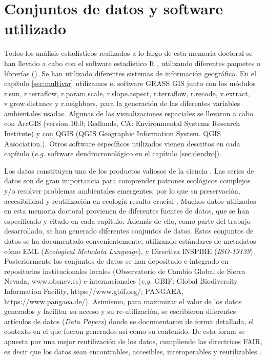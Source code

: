 \section{Conjuntos de datos y software utilizado}\label{sec:metodologia:datos}

Todos los análisis estadísticos realizados a lo largo de esta memoria doctoral se han llevado a cabo con el software estadístico R \autocite{RCoreTeam2020LanguageEnvironment}, utilizando diferentes paquetes o librerías (). Se han utilizado diferentes sistemas de información geográfica. En el capítulo \ref{sec:multivar} utilizamos el software GRASS GIS \autocite{Neteleretal2012GRASSGIS} junto con los módulos r.sun, r.terraflow, r.param.scale, r.slope.aspect, r.terraflow, r.recode, v.extract, v.grow.distance y r.neighbors, para la generación de las diferentes variables ambientales usadas. Algunas de las visualizaciones espaciales se llevaron a cabo con ArcGIS (version 10.0; Redlands, CA: Environmental Systems Research Institute) y con QGIS (QGIS Geographic Information System. QGIS Association.). Otros software específicos utilizados vienen descritos en cada capítulo (\emph{e.g.} software dendrocronológico en el capítulo \ref{sec:dendro}). 

Los datos constituyen uno de los productos valiosos de la ciencia \autocite{Costelloetal2013BiodiversityData}. Las series de datos son de gran importancia para comprender patrones ecológicos complejos y/o resolver problemas ambientales emergentes, por lo que su preservación, accesibilidad y reutilización en ecología resulta crucial \autocite{PerezLuqueRosCandeira2019CompartiendoDatos}. Muchos datos utilizados en esta memoria doctoral provienen de diferentes fuentes de datos, que se han especificado y citado en cada capítulo. Además de ello, como parte del trabajo desarrollado, se han generado diferentes conjuntos de datos. Estos conjuntos de datos se ha documentado convenientemente, utilizando estándares de metadatos cómo EML (\emph{Ecological Metadata Language}), y Directiva INSPIRE (\emph{ISO-19139}). Posteriormente los conjuntos de datos se han depositado e integrado en repositorios institucionales locales (Observatorio de Cambio Global de Sierra Nevada, www.obsnev.es) e internacionales (\emph{e.g.} GBIF: Global
Biodiversity Information Facility, https://www.gbif.org/; PANGAEA, https://www.pangaea.de/). Asimismo, para maximizar el valor de los datos generados y facilitar su acceso y su re-utilización, se escribieron diferentes artículos de datos (\emph{Data Papers}) donde se documentaron de forma detallada, el contexto en el que fueron generados así como su contenido. De esta forma se apuesta por una mejor reutilización de los datos, cumpliendo las directrices FAIR, es decir que los datos sean encontrables, accesibles, interoperables y reutilizables \autocite{Wilkinsonetal2016FAIRGuiding}.

